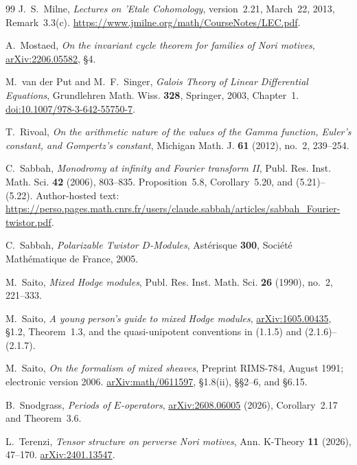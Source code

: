 \documentclass[11pt]{article}
\numberwithin{equation}{section}
\theoremstyle{definition}
\theoremstyle{remark}
\begin{document}
\begin{thebibliography}{99}
J.~S.~Milne, \emph{Lectures on 'Etale Cohomology}, version~2.21,
March~22, 2013, Remark~3.3(c).
\url{https://www.jmilne.org/math/CourseNotes/LEC.pdf}.

A.~Mostaed, \emph{On the invariant cycle theorem for families of Nori
motives}, \href{https://arxiv.org/abs/2206.05582}{arXiv:2206.05582}, \S4.

M.~van der Put and M.~F.~Singer, \emph{Galois Theory of Linear Differential
Equations}, Grundlehren Math. Wiss. \textbf{328}, Springer, 2003, Chapter~1.
\href{https://doi.org/10.1007/978-3-642-55750-7}{doi:10.1007/978-3-642-55750-7}.

T.~Rivoal,
\emph{On the arithmetic nature of the values of the Gamma function, Euler's constant, and Gompertz's constant},
Michigan Math. J. \textbf{61} (2012), no.~2, 239--254.

C.~Sabbah, \emph{Monodromy at infinity and Fourier transform II},
Publ. Res. Inst. Math. Sci. \textbf{42} (2006), 803--835.
Proposition~5.8, Corollary~5.20, and (5.21)--(5.22). Author-hosted text:
\url{https://perso.pages.math.cnrs.fr/users/claude.sabbah/articles/sabbah_Fourier-twistor.pdf}.

C.~Sabbah,
\emph{Polarizable Twistor $D$-Modules},
Ast\'erisque \textbf{300}, Soci\'et\'e Math\'ematique de France, 2005.

M.~Saito,
\emph{Mixed Hodge modules},
Publ. Res. Inst. Math. Sci. \textbf{26} (1990), no.~2, 221--333.

M.~Saito, \emph{A young person's guide to mixed Hodge modules},
\href{https://arxiv.org/abs/1605.00435}{arXiv:1605.00435},
\S1.2, Theorem~1.3, and the quasi-unipotent conventions in
(1.1.5) and (2.1.6)--(2.1.7).

M.~Saito, \emph{On the formalism of mixed sheaves},
Preprint RIMS-784, August 1991; electronic version 2006.
\href{https://arxiv.org/abs/math/0611597}{arXiv:math/0611597},
\S1.8(ii), \S\S2--6, and \S6.15.

B.~Snodgrass, \emph{Periods of $E$-operators},
\href{https://arxiv.org/abs/2608.06005}{arXiv:2608.06005} (2026),
Corollary~2.17 and Theorem~3.6.

L.~Terenzi, \emph{Tensor structure on perverse Nori motives},
Ann. K-Theory \textbf{11} (2026), 47--170.
\href{https://arxiv.org/abs/2401.13547}{arXiv:2401.13547}.


\end{thebibliography}
\end{document}
